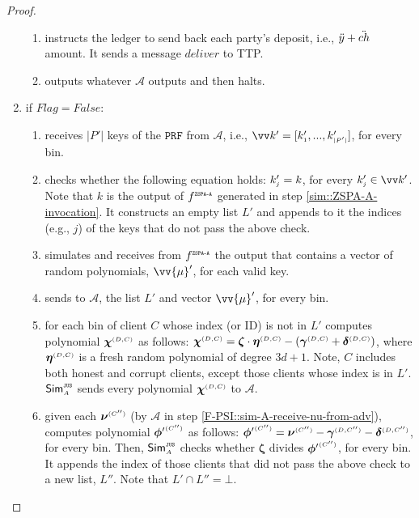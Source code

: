\begin{proof}
\begin{enumerate}
\begin{enumerate}
%
 \item instructs the ledger to send back each party's deposit, i.e., $\ddot{y}+\ddot{ch}$ amount. It sends a message $deliver$ to TTP.  
 \item outputs whatever $\mathcal{A}$ outputs and then halts. 
 \end{enumerate}
%
\item if $Flag=False$: 
%
\begin{enumerate}
%
 \item receives $|P'|$ keys of the $\mathtt{PRF}$ from $\mathcal{A}$, i.e., $\vv k'=[   k'_{\st 1}, ...,   k'_{\st |P'|}]$, for every bin. %
%
\item checks whether the following equation holds: $  k'_{\scriptscriptstyle j}=  k$, for every $  k'_{\st j}\in\vv k'$. Note that $  k$ is the output of $f^{\scriptscriptstyle \mathtt{ZSPA\text{-}A}}$ generated in step \ref{sim::ZSPA-A-invocation}. It constructs an empty list $  L'$ and appends to it the indices (e.g., $j$) of the keys that do not pass the above check. 
%
\item simulates \zspaa and receives from $f^{\scriptscriptstyle \mathtt{ZSPA\text{-}A}}$ the output that contains a vector of random polynomials, $\vv{\mu}'$, for each valid key. 
%
\item sends to  $\mathcal{A}$, the list $  L'$ and vector  $\vv{\mu}'$, for every bin. 
%
\item  for each bin of client $  {  C}$ whose index (or ID) is not in $  L'$ computes polynomial $ {\bm\chi}^{ \scriptscriptstyle {  {(D, C)}}}$ as follows: 
 $ {\bm\chi}^{ \scriptscriptstyle {  {(D, C)}}}= {\bm\zeta}\cdot  {\bm\eta}^{ \scriptscriptstyle {  {(D,C)}}}-( {\bm\gamma}^{ \scriptscriptstyle {  {(D,C)}}}+ {\bm\delta}^{ \scriptscriptstyle {  {(D,C)}}})$,   where $ {\bm\eta}^{ \scriptscriptstyle {  {(D,C)}}}$ is a fresh random polynomial of degree $3d+1$. Note, $C$ includes both honest and corrupt clients, except those clients whose index is in  $  L'$. $\mathsf{Sim}^{\scriptscriptstyle \mathtt{JUS}}_{\scriptscriptstyle A}$ sends every polynomial $ {\bm\chi}^{ \scriptscriptstyle {  {(D, C)}}}$ to  $\mathcal{A}$. 
 \item given each $ {\bm\nu}^{ \scriptscriptstyle {  {(C'')}} }$ (by $\mathcal{A}$ in step \ref{F-PSI::sim-A-receive-nu-from-adv}), computes polynomial $ {\bm\phi'}^{ \scriptscriptstyle {  {(C'')}} }$ as follows: ${\bm\phi'}^{ \scriptscriptstyle {  {(C'')}} } =  {\bm\nu}^{ \scriptscriptstyle {  {(C'')}} }-  {\bm\gamma}^{ \scriptscriptstyle {  {(D,C'')}}} -  {\bm\delta}^{ \scriptscriptstyle {  {(D,C'')}}}$, for every bin. Then, $\mathsf{Sim}^{\scriptscriptstyle \mathtt{JUS}}_{\scriptscriptstyle A}$ checks whether  $ {\bm\zeta}$  divides $ {\bm\phi'}^{ \scriptscriptstyle {  {(C'')}} }$, for every bin. It appends the index of those clients that did not pass the above check to a new list, $  L''$. Note that $  L'\cap   L''=\bot$.

\end{enumerate}
\end{enumerate}
\end{proof}
